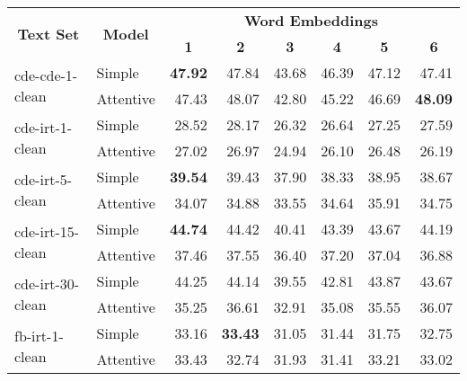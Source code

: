 \begin{tabular}{| l | l | r | r | r | r | r | r |}
    \hline

    \multicolumn{1}{|c|}{\multirow{2}{*}{\textbf{Text Set}}} &
    \multicolumn{1}{|c|}{\multirow{2}{*}{\textbf{Model}}} &
    \multicolumn{6}{|c|}{\textbf{Word Embeddings}} \\

    &
    &
    \multicolumn{1}{|c|}{\textbf{1}} &
    \multicolumn{1}{|c|}{\textbf{2}} &
    \multicolumn{1}{|c|}{\textbf{3}} &
    \multicolumn{1}{|c|}{\textbf{4}} &
    \multicolumn{1}{|c|}{\textbf{5}} &
    \multicolumn{1}{|c|}{\textbf{6}} \\

    \hline \hline

    \multirow{2}{*}{cde-cde-1-clean}
    & Simple    & \textbf{47.92} & 47.84          & 43.68 & 46.39 & 47.12 & 47.41          \\
    & Attentive & 47.43          & 48.07          & 42.80 & 45.22 & 46.69 & \textbf{48.09} \\ \hline

    \multirow{2}{*}{cde-irt-1-clean}
    & Simple    & 28.52          & 28.17          & 26.32 & 26.64 & 27.25 & 27.59          \\
    & Attentive & 27.02          & 26.97          & 24.94 & 26.10 & 26.48 & 26.19          \\ \hline

    \multirow{2}{*}{cde-irt-5-clean}
    & Simple    & \textbf{39.54} & 39.43          & 37.90 & 38.33 & 38.95 & 38.67          \\
    & Attentive & 34.07          & 34.88          & 33.55 & 34.64 & 35.91 & 34.75          \\ \hline

    \multirow{2}{*}{cde-irt-15-clean}
    & Simple    & \textbf{44.74} & 44.42          & 40.41 & 43.39 & 43.67 & 44.19          \\
    & Attentive & 37.46          & 37.55          & 36.40 & 37.20 & 37.04 & 36.88          \\ \hline

    \multirow{2}{*}{cde-irt-30-clean}
    & Simple    & 44.25          & 44.14          & 39.55 & 42.81 & 43.87 & 43.67          \\
    & Attentive & 35.25          & 36.61          & 32.91 & 35.08 & 35.55 & 36.07          \\ \hline \hline

    \multirow{2}{*}{fb-irt-1-clean}
    & Simple    & 33.16          & \textbf{33.43} & 31.05 & 31.44 & 31.75 & 32.75          \\
    & Attentive & 33.43          & 32.74          & 31.93 & 31.41 & 33.21 & 33.02          \\ \hline


\end{tabular}
